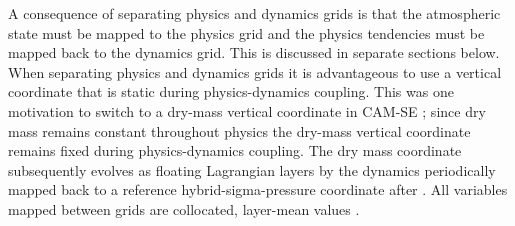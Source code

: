 \documentclass[twocol]{ametsoc}
\begin{document}
A consequence of separating physics and dynamics grids is that the atmospheric state must be mapped to the physics grid and the physics tendencies must be mapped back to the dynamics grid. This is discussed in separate sections below. When separating physics and dynamics grids it is advantageous to use a vertical coordinate that is static during physics-dynamics coupling. This was one motivation to switch to a dry-mass vertical coordinate in CAM-SE \citep{LetAl2018JAMES}; since dry mass remains constant throughout physics the dry-mass vertical coordinate remains fixed during physics-dynamics coupling. {\color{red}The dry mass coordinate subsequently evolves as floating Lagrangian layers by the dynamics \citep{L2004MWR} periodically mapped back to a reference hybrid-sigma-pressure coordinate after \cite{SB1981MWR}. All variables mapped between grids are collocated, layer-mean values \citep{LetAl2018JAMES}.{}}
 
\end{document}
